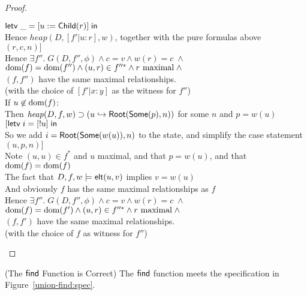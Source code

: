 \begin{proof}
\begin{tabbedproof}
\oooo $\mathsf{letv}\;\_ = [u := \mathsf{Child}(r)]\;\mathsf{in}\;$ \\
\oooo Hence $\mathit{heap}(D, [f'|u:r], w)$, together with the pure formulas above \\
\oooo $(r,c,n)]$ \\
\oooo Hence $\exists f''.\;G(D, f'', \phi) \land c = v \land w(r) = c \;\land$ \\
\oooox $\mbox{dom}({f}) = \mbox{dom}({f''}) \land (u,r) \in f''^{*} \land r\mbox{ maximal} \;\land$ \\
\oooox $(f,f'')$ have the same maximal relationships. \\
\ooox (with the choice of $[f'|x:y]$ as the witness for $f''$) \\
\ooo If $u \not\in \mbox{dom}({f})$:  \\
\oooo Then $\mathit{heap}(D,f,w) \supset (u \hookrightarrow \mathsf{Root}(\mathsf{Some}(p), n))$ for some $n$ and $p = w(u)$\\
\oooo $[\mathsf{letv}\;i = [!u]\;\mathsf{in}\;$ \\
\oooo So we add $i = \mathsf{Root}(\mathsf{Some}(w(u)), n)$ to the state, and simplify the case statement \\
\oooo $(u, p, n)]$\\
\oooo Note $(u, u) \in f^*$ and $u$ maximal, and that $p = w(u)$, and that $\mbox{dom}({f}) = \mbox{dom}({f})$ \\
\oooo The fact that $D, f, w \models \mathsf{elt}({u}, {v})$ implies $v = w(u)$\\ 
\oooo And obviously $f$ has the same maximal relationships as $f$ \\
\oooo Hence $\exists f''.\;G(D, f'', \phi) \land c = v \land w(r) = c \;\land$ \\
\oooox $\mbox{dom}({f}) = \mbox{dom}({f'}) \land (u,r) \in f''^{*} \land r\mbox{ maximal} \;\land$ \\
\oooox $(f,f')$ have the same maximal relationships. \\
\oooo (with the choice of $f$ as witness for $f''$) \\
\end{tabbedproof}
\end{proof}

\begin{lemma}{(The $\mathsf{find}$ Function is Correct)}
  The $\mathsf{find}$ function meets the specification in Figure~\ref{union-find:spec}. 
\end{lemma}

